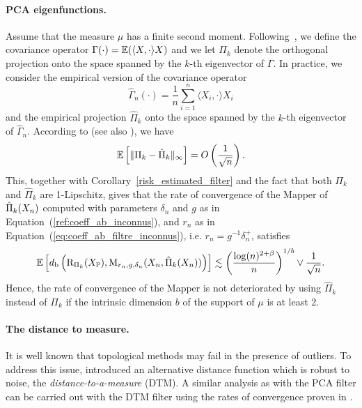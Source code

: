 \paragraph{PCA  eigenfunctions.} Assume that the measure $\mu$ has a finite second moment. 
Following~\cite{Biau12}, we define the covariance operator $\Gamma(\cdot) =\mathbb{E} ( \langle  X ,  \cdot \rangle X )$ and  
we let $\Pi_k$ denote the orthogonal projection onto the space spanned by the $k$-th  eigenvector of $\Gamma$.
 In practice, we consider the empirical version of the covariance operator 
$$ \hat  \Gamma_n (\cdot)  = \frac 1n \sum_{i=1}^n \langle  X_i ,   \cdot \rangle X_i  $$
and the empirical projection  $\hat \Pi_k$ onto the space spanned by the $k$-th eigenvector of $\hat  \Gamma_n $.  
According to  \cite{Biau12}(see also \cite{Blanchard07,Shawe05}), we have
$$\mathbb{E} \left[\| \Pi_k  - \hat \Pi_k  \|_\infty\right]  = O\left(\frac1 {\sqrt n}\right).$$ 
This, together with Corollary~\ref{risk_estimated_filter} and the fact that both $\Pi_k$ and $\hat \Pi_k$ are 1-Lipschitz, gives that
the rate of convergence of the Mapper of $\hat \Pi_k(X_n)$ computed with parameters $\delta_n$ and $g$
as in Equation~(\ref{ref:coeff_ab_inconnus}), and
$r_n$ as in Equation~(\ref{eq:coeff_ab_filtre_inconnus}), i.e. $r_n=g^{-1}\delta_n^+$, satisfies
$$
 \mathbb{E} \left[  d_{\rm b} \left( \mathrm{R}_{\Pi_k} (X_{\mathbb{P}}), \mathrm{M}_{r_n,g,\delta_n} (X_n, \hat \Pi_k(X_n)) \right) \right]
\lesssim  \left(\frac{{\log}(n)^{2+\beta}}{n}\right)^{1/b}  \vee \frac1 {\sqrt n}.
$$
Hence, the rate of convergence of the Mapper 
is not deteriorated by using $\hat \Pi_k$ instead of $\Pi_k$ if
the intrinsic dimension $b$ of the support of $\mu$ is at least 2. 



\paragraph*{The distance to measure.}  It is well known that topological methods may fail in the presence of outliers. 
To address this issue, \cite{Chazal11} introduced an alternative distance function which is robust to noise,  
the {\em distance-to-a-measure} (DTM).  A similar analysis  as  with the PCA filter can be carried out with the DTM filter 
using the rates of convergence proven in \cite{Chazal16b}.
























